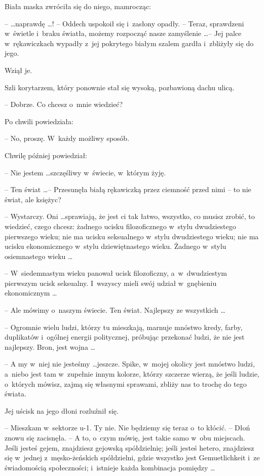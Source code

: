 \documentclass[oneside,polish,11pt,rmheadings]{mwbk}
\begin{document}
Biała maska zwróciła się do niego, mamrocząc: 

--  \ldots  naprawdę \ldots ! -- Oddech uspokoił się i~zasłony opadły. -- Teraz, sprawdzeni w~świetle i~braku światła, możemy rozpocząć nasze zamyślenie \ldots  -- Jej palce w~rękawiczkach wypadły z~jej pokrytego białym szalem gardła i~zbliżyły się do jego. 

Wziął je. 

Szli korytarzem, który ponownie stał się wysoką, pozbawioną dachu ulicą. 

-- Dobrze. Co chcesz o~mnie wiedzieć? 

Po chwili powiedziała: 

-- No, proszę. W~każdy możliwy sposób. 

Chwilę później powiedział: 

-- Nie jestem \ldots  szczęśliwy w~świecie, w~którym żyję. 

-- Ten świat \ldots  -- Przesunęła białą rękawiczką przez ciemność przed nimi -- to nie świat, ale księżyc? 

-- Wystarczy. Oni \ldots  sprawiają, że jest ci tak łatwo, wszystko, co musisz zrobić, to wiedzieć, czego chcesz: żadnego ucisku filozoficznego w~stylu dwudziestego pierwszego wieku; nie ma ucisku seksualnego w~stylu dwudziestego wieku; nie ma ucisku ekonomicznego w~stylu dziewiętnastego wieku. Żadnego w~stylu osiemnastego wieku  \ldots  

-- W~siedemnastym wieku panował ucisk filozoficzny, a~w~dwudziestym pierwszym ucisk seksualny. I~wszyscy mieli swój udział w~gnębieniu ekonomicznym \ldots  

-- Ale mówimy o~naszym świecie. Ten świat. Najlepszy ze wszystkich \ldots  

-- Ogromnie wielu ludzi, którzy tu mieszkają, marnuje mnóstwo kredy, farby, duplikatów i~ogólnej energii politycznej, próbując przekonać ludzi, że nie jest najlepszy. Bron, jest wojna  \ldots  

-- A my w~niej nie jesteśmy \ldots  jeszcze. Spike, w~mojej okolicy jest mnóstwo ludzi, a~niebo jest tam w~zupełnie innym kolorze, którzy szczerze wierzą, że jeśli ludzie, o~których mówisz, zajmą się własnymi sprawami, zbliży nas to trochę do tego świata. 

Jej uścisk na jego dłoni rozluźnił się. 

-- Mieszkam w~sektorze u-1. Ty nie. Nie będziemy się teraz o~to kłócić. -- Dłoń znowu się zacisnęła. -- A to, o~czym mówię, jest takie samo w~obu miejscach. Jeśli jesteś gejem, znajdziesz gejowską spółdzielnię; jeśli jesteś hetero, znajdziesz się w~jednej z~męsko-żeńskich spółdzielni, gdzie wszystko jest Gemuetlichkeit  i~ze świadomością społeczności; i~istnieje każda kombinacja pomiędzy \ldots  
\end{document}
